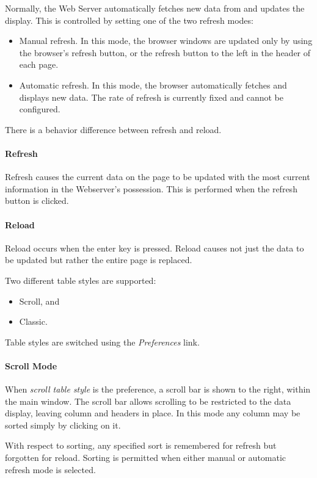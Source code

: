     Normally, the Web Server automatically fetches new data from {\DUCC} and updates the display.
    This is controlled by setting one of the two refresh modes:
    \begin{itemize}
      \item Manual refresh.  In this mode, the browser windows are updated only by using the
        browser's refresh button, or the {\DUCC} refresh button to the left in the header of
        each page.
      \item Automatic refresh. In this mode, the browser automatically fetches and displays
        new data.  The rate of refresh is currently fixed and cannot be configured.
    \end{itemize}
    
    There is a behavior difference between refresh and reload.
    \paragraph{Refresh}
    Refresh causes the current data on the page to be updated with the most
    current information in the Webserver's possession.  This is performed
    when the refresh button is clicked.
    \paragraph{Reload}
    Reload occurs when the enter key is pressed.  Reload causes not just the
    data to be updated but rather the entire page is replaced.
    
    Two different table styles are supported:
    \begin{itemize}
      \item Scroll, and
      \item Classic.
    \end{itemize}
    Table styles are switched using the {\em Preferences} link.

    \paragraph{Scroll Mode}  When {\em scroll table style} is the preference, a scroll bar is
    shown to the right, within the main window.  The scroll bar allows scrolling to be restricted to the data
    display, leaving column and {\DUCC} headers in place.  In this mode any column may be sorted
    simply by clicking on it.
    
    With respect to sorting, any specified sort is remembered for refresh
    but forgotten for reload.  Sorting is permitted when either manual
    or automatic refresh mode is selected.
    
